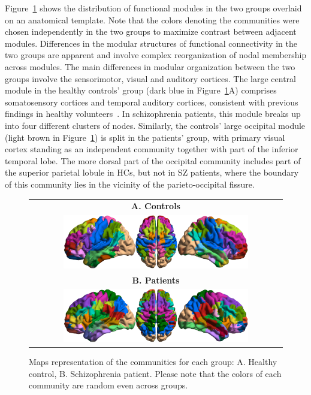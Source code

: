 Figure~\ref{fig:schizo_figure5} shows the distribution of functional modules in the two groups overlaid on an anatomical template.
Note that the colors denoting the communities were chosen independently in the two groups to maximize contrast between adjacent modules.
Differences in the modular structures of functional connectivity in the two groups are apparent and involve complex reorganization of nodal membership across modules.
The main differences in modular organization between the two groups involve the sensorimotor, visual and auditory cortices.
The large central module in the healthy controls' group (dark blue in Figure~\ref{fig:schizo_figure5}A) comprises somatosensory cortices and temporal auditory cortices, consistent with previous findings in healthy volunteers~\cite{javitt2015}.
In schizophrenia patients, this module breaks up into four different clusters of nodes.
Similarly, the controls' large occipital module (light brown in Figure~\ref{fig:schizo_figure5}) is split in the patients' group, with primary visual cortex standing as an independent community together with part of the inferior temporal lobe.
The more dorsal part of the occipital community includes part of the superior parietal lobule in HCs, but not in SZ patients, where the boundary of this community lies in the vicinity of the parieto-occipital fissure.

\begin{figure}
\centering
    \begin{tabular}{c}
    \textbf{\textsf{A. Controls}} \\
    \includegraphics[width=0.75\textwidth]{images/schizo/schizo_fig_5a.jpg} \\
    \textbf{\textsf{B. Patients}} \\
    \includegraphics[width=0.75\textwidth]{images/schizo/schizo_fig_5b.jpg} \\
    \end{tabular}
\caption{Maps representation of the communities for each group: A. Healthy control, B. Schizophrenia patient. Please note that the colors of each community are random even across groups.}
\label{fig:schizo_figure5}
\end{figure}

